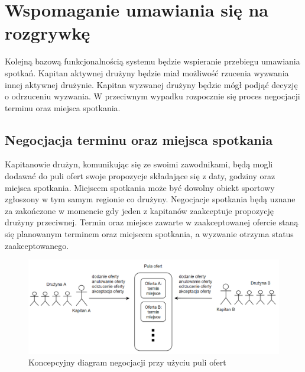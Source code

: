 \section{Wspomaganie umawiania się na rozgrywkę}

Kolejną bazową funkcjonalnością systemu będzie wspieranie przebiegu umawiania spotkań. Kapitan aktywnej drużyny będzie miał możliwość rzucenia wyzwania innej aktywnej drużynie. Kapitan wyzwanej drużyny będzie mógł podjąć decyzję o odrzuceniu wyzwania. W przeciwnym wypadku rozpocznie się proces negocjacji terminu oraz miejsca spotkania. 

\subsection{Negocjacja terminu oraz miejsca spotkania}

Kapitanowie drużyn, komunikując się ze swoimi zawodnikami, będą mogli dodawać do puli ofert swoje propozycje składające się z daty, godziny oraz miejsca spotkania. Miejscem spotkania może być dowolny obiekt sportowy zgłoszony w tym samym regionie co drużyny.  Negocjacje spotkania będą uznane za zakończone w momencie gdy jeden z kapitanów zaakceptuje propozycję drużyny przeciwnej. Termin oraz miejsce zawarte w zaakceptowanej ofercie staną się planowanym terminem oraz miejscem spotkania, a wyzwanie otrzyma status zaakceptowanego.

\begin{figure}[ht]
\centering
\includegraphics[width=\linewidth]{03-koncept/rys/offer-pool.PNG}
\caption{Koncepcyjny diagram negocjacji przy użyciu puli ofert}
\label{fig:diagram-alg-ext}
\end{figure}

